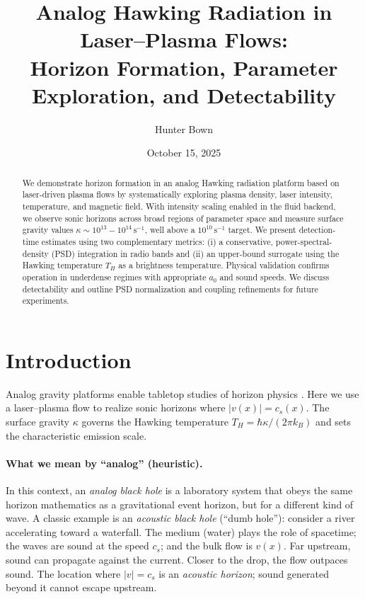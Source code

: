 \documentclass[11pt]{article}
\title{Analog Hawking Radiation in Laser--Plasma Flows:\\Horizon Formation, Parameter Exploration, and Detectability}
\author{Hunter Bown}
\date{October 15, 2025}
\begin{document}
\maketitle

\begin{abstract}
We demonstrate horizon formation in an analog Hawking radiation platform based on laser-driven plasma flows by systematically exploring plasma density, laser intensity, temperature, and magnetic field. With intensity scaling enabled in the fluid backend, we observe sonic horizons across broad regions of parameter space and measure surface gravity values $\kappa \sim 10^{13}{-}10^{14}\,\mathrm{s^{-1}}$, well above a $10^{10}\,\mathrm{s^{-1}}$ target. We present detection-time estimates using two complementary metrics: (i) a conservative, power-spectral-density (PSD) integration in radio bands and (ii) an upper-bound surrogate using the Hawking temperature $T_H$ as a brightness temperature. Physical validation confirms operation in underdense regimes with appropriate $a_0$ and sound speeds. We discuss detectability and outline PSD normalization and coupling refinements for future experiments.
\end{abstract}

\section{Introduction}
Analog gravity platforms enable tabletop studies of horizon physics \cite{Hawking1974,Hawking1975,Unruh1981,Barcelo2011,Weinfurtner2011,Steinhauer2016,Drori2019}. Here we use a laser--plasma flow to realize sonic horizons where $|v(x)| = c_s(x)$. The surface gravity $\kappa$ governs the Hawking temperature $T_H = \hbar \kappa/(2\pi k_B)$ and sets the characteristic emission scale.

\paragraph{What we mean by ``analog'' (heuristic).}
In this context, an \emph{analog black hole} is a laboratory system that obeys the same horizon mathematics as a gravitational event horizon, but for a different kind of wave. A classic example is an \emph{acoustic black hole} (``dumb hole''): consider a river accelerating toward a waterfall. The medium (water) plays the role of spacetime; the waves are sound at the speed $c_s$; and the bulk flow is $v(x)$. Far upstream, sound can propagate against the current. Closer to the drop, the flow outpaces sound. The location where $|v| = c_s$ is an \emph{acoustic horizon}; sound generated beyond it cannot escape upstream.
\end{document}
